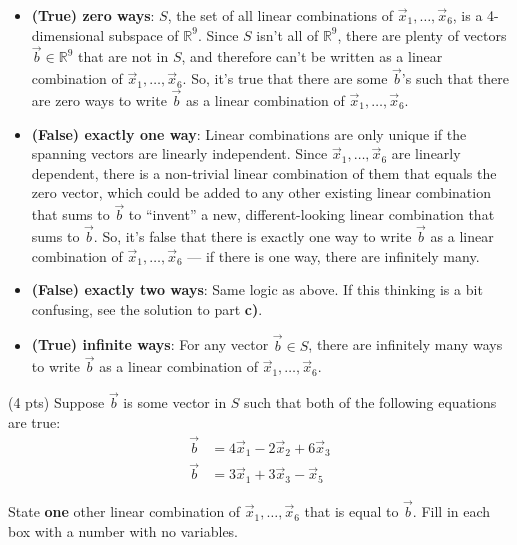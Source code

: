 \documentclass[11pt]{article}
\begin{document}
\begin{prob}[(14 pts)]
\begin{subprob}
\begin{solution}
\begin{itemize}
    \item \textbf{(True) zero ways}: $S$, the set of all linear combinations of $\vec x_1, \ldots, \vec x_6$, is a 4-dimensional subspace of $\mathbb{R}^9$. Since $S$ isn't all of $\mathbb{R}^9$, there are plenty of vectors $\vec b \in \mathbb{R}^9$ that are not in $S$, and therefore can't be written as a linear combination of $\vec x_1, \ldots, \vec x_6$. So, it's true that there are some $\vec b$'s such that there are zero ways to write $\vec b$ as a linear combination of $\vec x_1, \ldots, \vec x_6$.
    \item \textbf{(False) exactly one way}: Linear combinations are only unique if the spanning vectors are linearly independent. Since $\vec x_1, \ldots, \vec x_6$ are linearly dependent, there is a non-trivial linear combination of them that equals the zero vector, which could be added to any other existing linear combination that sums to $\vec b$ to ``invent'' a new, different-looking linear combination that sums to $\vec b$. So, it's false that there is exactly one way to write $\vec b$ as a linear combination of $\vec x_1, \ldots, \vec x_6$ --- if there is one way, there are infinitely many.
    \item \textbf{(False) exactly two ways}: Same logic as above. If this thinking is a bit confusing, see the solution to part \textbf{c)}.
    \item \textbf{(True) infinite ways}: For any vector $\vec b \in S$, there are infinitely many ways to write $\vec b$ as a linear combination of $\vec x_1, \ldots, \vec x_6$.
\end{itemize}

\end{solution}
\end{subprob}

\begin{subprob}(4 pts) Suppose $\vec b$ is some vector in $S$ such that both of the following equations are true:
\[
\begin{aligned}
    \vec b &= 4 \vec x_1 - 2 \vec x_2 + 6 \vec x_3 \\
    \vec b &= 3 \vec x_1 + 3 \vec x_3 - \vec x_5
\end{aligned}
\]

State \textbf{one} other linear combination of $\vec x_1, \ldots, \vec x_6$ that is equal to $\vec b$. Fill in each box with a number with no variables. \\


\end{subprob}
\end{prob}
\end{document}
